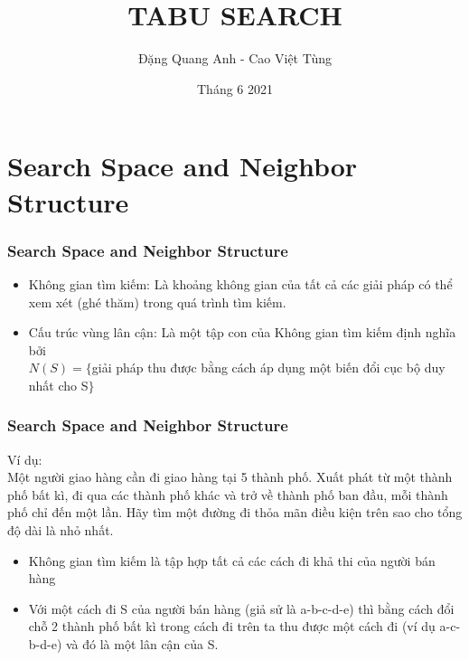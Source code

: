 \documentclass[12pt]{beamer}
\begin{document}
	\author{Đặng Quang Anh - Cao Việt Tùng}
	\title{TABU SEARCH}
	\date{Tháng 6 2021}
	\maketitle
	

	\section{Search Space and Neighbor Structure}
	\begin{frame}
		\frametitle{Search Space and Neighbor Structure}
		\begin{itemize}
			\item Không gian tìm kiếm: Là khoảng không gian của tất cả các giải pháp có thể xem xét (ghé thăm) trong quá trình tìm kiếm.
			\item Cấu trúc vùng lân cận: Là một tập con của Không gian tìm kiếm định nghĩa bởi\\
					$N(S) = \{ $giải pháp thu được bằng cách áp dụng một biến đổi cục bộ duy nhất cho S$ \}$
		\end{itemize}
	\end{frame}

	\begin{frame}
		\frametitle{Search Space and Neighbor Structure}
		Ví dụ:\\
		Một người giao hàng cần đi giao hàng tại 5 thành phố. Xuất phát từ một thành phố bất kì, đi qua các thành phố khác  và trở về thành phố ban đầu, mỗi thành phố chỉ đến một lần. Hãy tìm một đường đi thỏa mãn điều kiện trên sao cho tổng độ dài là nhỏ nhất.\\
		\begin{itemize}
			\item Không gian tìm kiếm là tập hợp tất cả các cách đi khả thi của người bán hàng
			\item Với một cách đi S của người bán hàng (giả sử là a-b-c-d-e) thì bằng cách đổi chỗ 2 thành phố bất kì trong cách đi trên ta thu được một cách đi (ví dụ a-c-b-d-e) và đó là một lân cận của S.
		\end{itemize}
	\end{frame}
	
\end{document}
